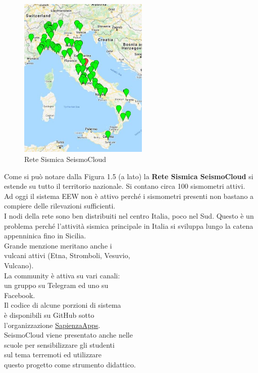 \documentclass[a4paper,10pt]{memoir}
\begin{document}
\begin{figure}
\caption{Rete Sismica SeismoCloud}
\label{fig:RSS}
\includegraphics[width=0.55\textwidth]{Chapter-1/seismoitalia.jpg}
\end{figure}
Come si può notare dalla Figura 1.5 (a lato) la \textbf{Rete Sismica SeismoCloud} si estende su tutto il territorio nazionale. Si contano circa 100 sismometri attivi.\\
Ad oggi il sistema EEW non è attivo perché i sismometri presenti non bastano a compiere delle rilevazioni sufficienti.\\
I nodi della rete sono ben distribuiti nel centro Italia, poco nel Sud. Questo è un problema perché l'attività sismica principale in Italia si sviluppa lungo la catena appenninica fino in Sicilia. \\
Grande menzione meritano anche i \\vulcani attivi (Etna, Stromboli, Vesuvio, \\Vulcano).\\ La community è attiva su vari canali: \\un gruppo su Telegram ed uno su \\Facebook.\\
Il codice di alcune porzioni di sistema \\è disponibili su GitHub sotto
\\
l'organizzazione \href{https://github.com/SapienzaApps}{SapienzaApps}.\\
SeismoCloud viene presentato anche nelle \\scuole per sensibilizzare gli studenti \\sul tema terremoti ed
utilizzare \\questo progetto come
strumento didattico.
\end{document}
